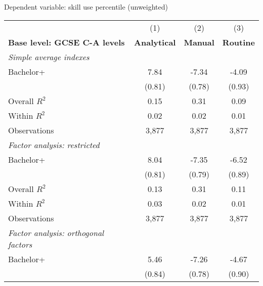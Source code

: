 \begin{center}
\begin{threeparttable}[!h]
\caption{Dependent variable: skill use percentile (unweighted)}
\label{tab:skillRegs}
\begin{tabular}{lccc}
\toprule
\toprule
&\multicolumn{1}{c}{(1)}&\multicolumn{1}{c}{(2)}&\multicolumn{1}{c}{(3)} \\
\textbf{Base level: GCSE C-A levels}&\multicolumn{1}{c}{\textbf{Analytical}}&\multicolumn{1}{c}{\textbf{Manual}}&\multicolumn{1}{c}{\textbf{Routine}} \\
\midrule
\textit{Simple average indexes}\vspace{1mm} \\ 
\hspace{3mm}Bachelor+&        7.84\sym{***}&       -7.34\sym{***}&       -4.09\sym{***}\\
                    &      (0.81)         &      (0.78)         &      (0.93)         \\
\midrule Overall $ R^2$&        0.15         &        0.31         &        0.09         \\
Within $ R^2$       &        0.02         &        0.02         &        0.01         \\
Observations        &       3,877         &       3,877         &       3,877         \\
\midrule \vspace{1mm}\textit{Factor analysis: restricted} \\ 
\hspace{3mm}Bachelor+&        8.04\sym{***}&       -7.35\sym{***}&       -6.52\sym{***}\\
                    &      (0.81)         &      (0.79)         &      (0.89)         \\
\midrule Overall $ R^2$&        0.13         &        0.31         &        0.11         \\
Within $ R^2$       &        0.03         &        0.02         &        0.01         \\
Observations        &       3,877         &       3,877         &       3,877         \\
\midrule \vspace{1mm}\textit{Factor analysis: orthogonal factors} \\ 
\hspace{3mm}Bachelor+&        5.46\sym{***}&       -7.26\sym{***}&       -4.67\sym{***}\\
                    &      (0.84)         &      (0.78)         &      (0.90)         \\

\end{tabular}
\end{threeparttable}
\end{center}
